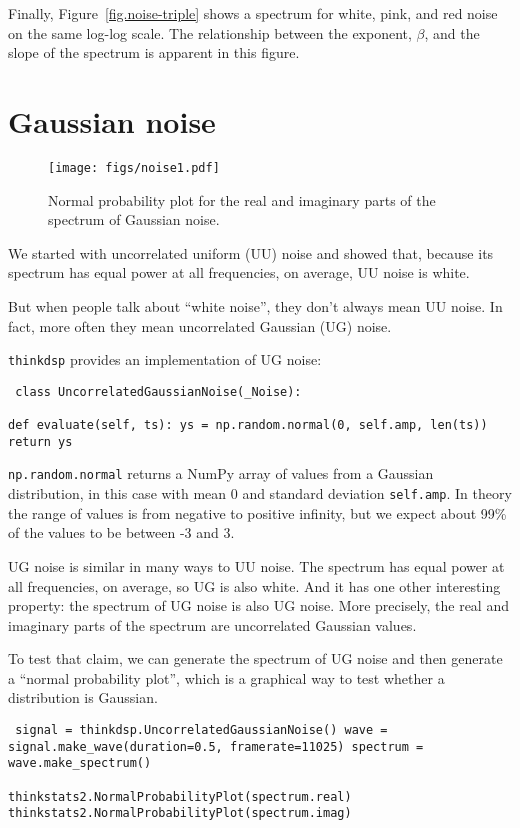 \documentclass[12pt]{book} \usepackage[width=5.5in,height=8.5in, hmarginratio=3:2,vmarginratio=1:1]{geometry}
\begin{document}
Finally, Figure~\ref{fig.noise-triple} shows a spectrum for white, pink, and red noise on the same log-log scale. The relationship between the exponent, $\beta$, and the slope of the spectrum is apparent in this figure. 

\section{Gaussian noise} 

\begin{figure} 

\centerline{\texttt{[image: figs/noise1.pdf]}} \caption{Normal probability plot for the real and imaginary parts of the spectrum of Gaussian noise.} \label{fig.noise1} \end{figure} 

We started with uncorrelated uniform (UU) noise and showed that, because its spectrum has equal power at all frequencies, on average, UU noise is white. 

But when people talk about ``white noise'', they don't always mean UU noise. In fact, more often they mean uncorrelated Gaussian (UG) noise. 

{\tt thinkdsp} provides an implementation of UG noise: 

\begin{verbatim} class UncorrelatedGaussianNoise(_Noise): 

def evaluate(self, ts): ys = np.random.normal(0, self.amp, len(ts)) return ys \end{verbatim} 

{\tt np.random.normal} returns a NumPy array of values from a Gaussian distribution, in this case with mean 0 and standard deviation {\tt self.amp}. In theory the range of values is from negative to positive infinity, but we expect about 99\% of the values to be between -3 and 3. 

UG noise is similar in many ways to UU noise. The spectrum has equal power at all frequencies, on average, so UG is also white. And it has one other interesting property: the spectrum of UG noise is also UG noise. More precisely, the real and imaginary parts of the spectrum are uncorrelated Gaussian values. 

To test that claim, we can generate the spectrum of UG noise and then generate a ``normal probability plot'', which is a graphical way to test whether a distribution is Gaussian. 

\begin{verbatim} signal = thinkdsp.UncorrelatedGaussianNoise() wave = signal.make_wave(duration=0.5, framerate=11025) spectrum = wave.make_spectrum() 

thinkstats2.NormalProbabilityPlot(spectrum.real) thinkstats2.NormalProbabilityPlot(spectrum.imag) \end{verbatim} 
\end{document}
